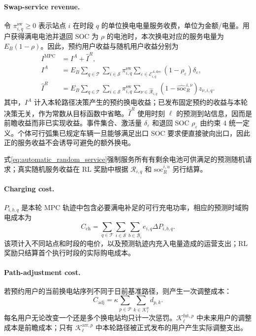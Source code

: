 \documentclass[12pt,a4paper,UTF8]{ctexart}
\begin{document}
\paragraph{Swap-service revenue.}
令 $\pi_{i,q}^{\mathrm{sw}}\ge0$ 表示站点 $i$ 在时段 $q$ 的单位换电电量服务收费，单位为金额/电量。用户获得满电电池并退回 SOC 为 $\rho$ 的电池时，本次换电对应的服务电量为 $E_B(1-\rho)$。因此，预约用户收益与随机用户收益分别为
\begin{equation}
\begin{aligned}
I^{\mathrm{MPC}}&=I^{A}+\widehat I^{R},\\
I^{A}
&=E_B\sum_{q\in\mathcal T}
\sum_{i\in\mathcal S}\pi_{i,q}^{\mathrm{sw}}
\sum_{\varepsilon\in\mathcal E_{i,q}^{A,\mathrm{dec}}}
(1-\rho_\varepsilon)\delta_\varepsilon,\\
\widehat I^{R}
&=E_B\sum_{q\in\mathcal T}
\sum_{i\in\mathcal S}\pi_{i,q}^{\mathrm{sw}}
\sum_{\nu\in\widehat{\mathcal R}_{i,q}}
(1-\widehat{\mathrm{soc}}_{R}^{i,\nu})
z_{\nu,i,q}.
\end{aligned}
\label{eq:income}
\end{equation}
其中，$I^{A}$ 计入本轮路径决策产生的预约换电收益；已发布固定预约的收益与本轮决策无关，作为常数从目标函数中省略。$\widehat I^{R}$ 使用时刻 $\ell$ 的预测到站信息，因而是前瞻收益而非已实现收益。事件集合、激活量 $\delta_\varepsilon$ 和退回 SOC $\rho_\varepsilon$ 由约束 4 统一定义。个体可行弧集已规定车辆一旦能够满足出口 SOC 要求便直接驶向出口，因此正的服务收益不会诱导可避免的额外换电。

式\eqref{eq:automatic_random_service}强制服务所有有剩余电池可供满足的预测随机请求；真实随机服务收益在 RL 奖励中根据 $\mathcal R_{i,q}$ 和 $\mathrm{soc}_R^{i,u}$ 另行结算。

\paragraph{Charging cost.}
$P_{i,b,q}$ 是本轮 MPC 轨迹中包含必要满电补足的可行充电功率，相应的预测时域购电成本为
\begin{equation}
C_{\mathrm{ch}}
=
\sum_{q\in\mathcal T}
\sum_{i\in\mathcal S}
\sum_{b\in\mathcal B_i}
e_{i,q}\Delta P_{i,b,q}.
\label{eq:chargingcost}
\end{equation}
该项计入不同站点和时段的电价，以及预测轨迹内充入电量造成的运营支出；RL 奖励只结算首个执行时段的实际购电成本。

\paragraph{Path-adjustment cost.}
若预约用户的当前换电站序列不同于日前基准路径，则产生一次调整成本：
\begin{equation}
C_{\mathrm{adj}}
=
\kappa
\sum_{p\in\mathcal P}
\sum_{k\in\mathcal K_\ell^p}
d_{p,k}.
\label{eq:adjustment_cost}
\end{equation}
每名用户无论改变一个还是多个换电站均只计一次惩罚。$\mathcal K_\ell^{\mathrm{fut},p}$ 中未来用户的调整成本是前瞻成本；只有
$\mathcal K_\ell^{\mathrm{arr},p}$ 中本轮路径被正式发布的用户产生实际调整支出。
\end{document}
